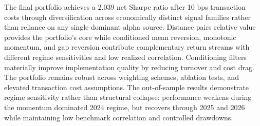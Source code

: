 \documentclass{article}
\begin{document}
The final portfolio achieves a 2.039 net Sharpe ratio after 10 bps transaction costs through diversification across economically distinct signal families rather than reliance on any single dominant alpha source. Distance pairs relative value provides the portfolio’s core while conditioned mean reversion, monotonic momentum, and gap reversion contribute complementary return streams with different regime sensitivities and low realized correlation. Conditioning filters materially improve implementation quality by reducing turnover and cost drag. The portfolio remains robust across weighting schemes, ablation tests, and elevated transaction cost assumptions. The out-of-sample results demonstrate regime sensitivity rather than structural collapse: performance weakens during the momentum dominated 2024 regime, but recovers through 2025 and 2026 while maintaining low benchmark correlation and controlled drawdowns.
\end{document}
